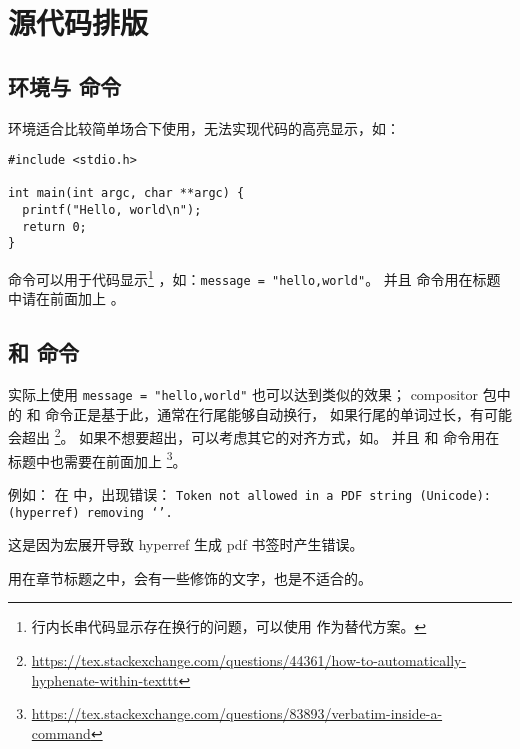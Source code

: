 \chapter{源代码排版}

\section{\protect{} 环境与 \protect{} 命令}

 环境适合比较简单场合下使用，无法实现代码的高亮显示，如：

\begin{texcode}
\begin{verbatim}
#include <stdio.h>

int main(int argc, char **argc) {
  printf("Hello, world\n");
  return 0;
}
\end{verbatim}
\end{texcode}

 命令可以用于代码显示\footnote{行内长串代码显示存在换行的问题，可以使用  作为替代方案。}
，如：\texttt{\verb|message = "hello,world"|}。
并且  命令用在标题中请在前面加上 。

\section{\protect{} 和 \protect{} 命令}

实际上使用 \texttt{{\tffamily message = "hello,world"}} 也可以达到类似的效果；
compositor 包中的  和  命令正是基于此，通常在行尾能够自动换行，
如果行尾的单词过长，有可能会超出
\footnote{\url{https://tex.stackexchange.com/questions/44361/how-to-automatically-hyphenate-within-texttt}}。
如果不想要超出，可以考虑其它的对齐方式，如。
并且  和  命令用在标题中也需要在前面加上 
\footnote{\url{https://tex.stackexchange.com/questions/83893/verbatim-inside-a-command}}。

例如： 在   中，出现错误：
\texttt{Token not allowed in a PDF string (Unicode): (hyperref) removing `\new@ifnextchar'.} 

这是因为宏展开导致 hyperref 生成 pdf 书签时产生错误。

\begin{remark*}
 用在章节标题之中，会有一些修饰的文字，也是不适合的。
\end{remark*}

